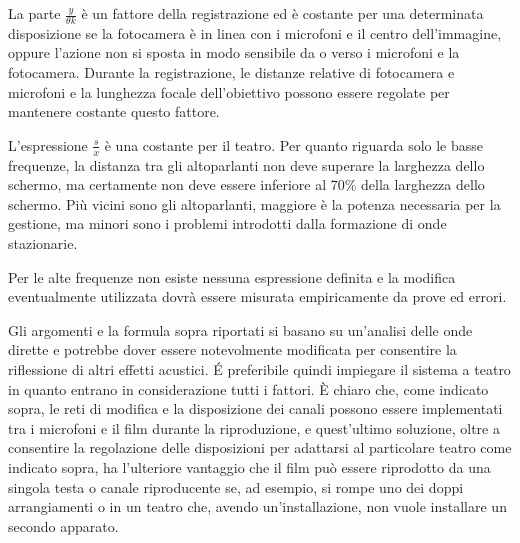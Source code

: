\documentclass[11pt]{article}
\begin{document}
\begin{multicols*}{2}
La parte $\frac{y}{\theta k}$ è un fattore della registrazione ed è costante per una determinata disposizione se la fotocamera è in linea con i microfoni e il centro dell'immagine, oppure l'azione non si sposta in modo sensibile da o verso i microfoni e la fotocamera. Durante la registrazione, le distanze relative di fotocamera e microfoni e la lunghezza focale dell'obiettivo possono essere regolate per mantenere costante questo fattore.

L'espressione $\frac{s}{x}$ è una costante per il teatro. Per quanto riguarda solo le basse frequenze, la distanza tra gli altoparlanti non deve superare la larghezza dello schermo, ma certamente non deve essere inferiore al 70\% della larghezza dello schermo. Più vicini sono gli altoparlanti, maggiore è la potenza necessaria per la gestione, ma minori sono i problemi introdotti dalla formazione di onde stazionarie.

Per le alte frequenze non esiste nessuna espressione definita e la modifica eventualmente utilizzata dovrà essere misurata empiricamente da prove ed errori.

Gli argomenti e la formula sopra riportati si basano su un'analisi delle onde dirette e potrebbe dover essere notevolmente modificata per consentire la riflessione di altri effetti acustici. É preferibile quindi impiegare il sistema a teatro in quanto entrano in considerazione tutti i fattori. È chiaro che, come indicato sopra, le reti di modifica e la disposizione dei canali possono essere implementati tra i microfoni e il film durante la riproduzione, e quest'ultimo soluzione, oltre a consentire la regolazione delle disposizioni per adattarsi al particolare teatro come indicato sopra, ha l'ulteriore vantaggio che il film può essere riprodotto da una singola testa o canale riproducente se, ad esempio, si rompe uno dei doppi arrangiamenti o in un teatro che, avendo un'installazione, non vuole installare un secondo apparato.


\end{multicols*}
\end{document}
